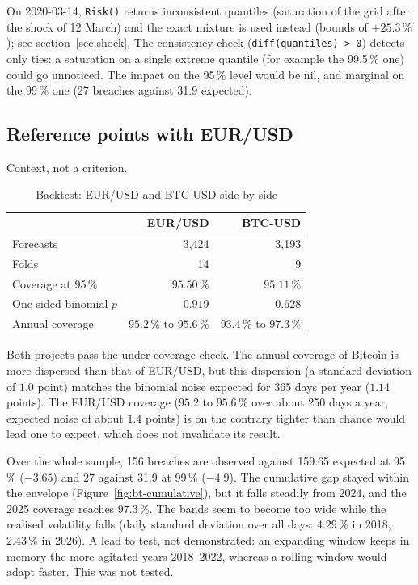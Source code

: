 \documentclass[12pt,a4paper]{article}
\begin{document}
On 2020-03-14, \texttt{Risk()} returns inconsistent quantiles (saturation of the grid after the shock of 12 March) and the exact mixture is used instead (bounds of $\pm25.3\,\%$); see section~\ref{sec:shock}. The consistency check (\texttt{diff(quantiles) > 0}) detects only ties: a saturation on a single extreme quantile (for example the 99.5\,\% one) could go unnoticed. The impact on the 95\,\% level would be nil, and marginal on the 99\,\% one (27 breaches against 31.9 expected).

\subsection{Reference points with EUR/USD}

Context, not a criterion.

\begin{table}[H]
	\centering
	\caption{Backtest: EUR/USD and BTC-USD side by side}
	\label{tab:bt-eur}
	\begin{tabular}{lrr}
		\toprule
		& EUR/USD & BTC-USD \\
		\midrule
		Forecasts & 3,424 & 3,193 \\
		Folds & 14 & 9 \\
		Coverage at 95\,\% & $95.50\,\%$ & $95.11\,\%$ \\
		One-sided binomial $p$ & $0.919$ & $0.628$ \\
		Annual coverage & $95.2\,\%$ to $95.6\,\%$ & $93.4\,\%$ to $97.3\,\%$ \\
		\bottomrule
	\end{tabular}
\end{table}

Both projects pass the under-coverage check. The annual coverage of Bitcoin is more dispersed than that of EUR/USD, but this dispersion (a standard deviation of $1.0$ point) matches the binomial noise expected for 365 days per year ($1.14$ points). The EUR/USD coverage ($95.2$ to $95.6\,\%$ over about 250 days a year, expected noise of about $1.4$ points) is on the contrary tighter than chance would lead one to expect, which does not invalidate its result.

\begin{econbox}
	Over the whole sample, 156 breaches are observed against 159.65 expected at 95\,\% ($-3.65$) and 27 against 31.9 at 99\,\% ($-4.9$). The cumulative gap stayed within the envelope (Figure~\ref{fig:bt-cumulative}), but it falls steadily from 2024, and the 2025 coverage reaches $97.3\,\%$. The bands seem to become too wide while the realised volatility falls (daily standard deviation over all days: $4.29\,\%$ in 2018, $2.43\,\%$ in 2026). A lead to test, not demonstrated: an expanding window keeps in memory the more agitated years 2018--2022, whereas a rolling window would adapt faster. This was not tested.
\end{econbox}
\end{document}
